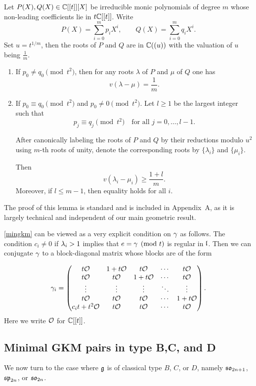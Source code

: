 \documentclass[11pt]{article}
\numberwithin{equation}{section}
\begin{document}
\begin{lem}\label{separate valuations}
Let $P(X),Q(X)\in \mathbb{C}[[t]][X]$ be irreducible monic polynomials of degree $m$
whose non-leading coefficients lie in $t\mathbb{C}[[t]]$. Write
\[
P(X)=\sum_{i=0}^{m} p_i X^i,
\qquad
Q(X)=\sum_{i=0}^{m} q_i X^i.
\]
Set $u=t^{1/m}$, then the roots of $P$ and $Q$ are in $\mathbb{C}((u))$ with the valuation of $u$ being $\frac{1}{m}$.
\begin{enumerate}
    \item If $p_0\neq q_0 \pmod{t^2}$, then for any roots $\lambda$ of $P$ and $\mu$ of $Q$ one has
\[
v(\lambda-\mu)=\frac{1}{m}.
\]
\item If $p_0\equiv q_0 \pmod{t^2}$ and $p_0\neq 0 \pmod{t^2}$. Let $l\ge 1$ be the largest integer such that
\[
p_j \equiv q_j \pmod{t^2}
\quad\text{for all } j=0,\dots,l-1.
\]

After canonically labeling the roots of $P$ and $Q$ by their reductions
modulo $u^2$ using $m$-th roots of unity, denote the corresponding roots by
$\{\lambda_i\}$ and $\{\mu_i\}$.

Then
\[
v(\lambda_i-\mu_i)\ge \frac{1+l}{m}.
\]
Moreover, if $l\leqslant m-1$, then equality holds for all $i$.
\end{enumerate}
\end{lem}
The proof of this lemma is standard and is included in Appendix~A, as it is largely
technical and independent of our main geometric result.
\begin{rem}
    \cref{mingkm} can be viewed as a very explicit condition on $\gamma$ as follows. The condition $c_i\neq 0$ if $\lambda_i>1$ implies that $e=\gamma\pmod{t}$ is regular in $\mathfrak{l}$. Then we can conjugate $\gamma$ to a block-diagonal matrix whose blocks are of the form

    \[ \gamma_i=
\begin{pmatrix}
t\mathcal{O} & 1+t\mathcal{O} & t\mathcal{O} & \cdots & t\mathcal{O} \\
t\mathcal{O} & t\mathcal{O} & 1+t\mathcal{O} & \cdots & t\mathcal{O} \\
\vdots & \vdots & \vdots & \ddots & \vdots \\
t\mathcal{O} & t\mathcal{O} & t\mathcal{O} & \cdots & 1+t\mathcal{O} \\
c_it+t^2\mathcal{O} & t\mathcal{O} & t\mathcal{O} & \cdots & t\mathcal{O}
\end{pmatrix}.
\]
Here we write $\mathcal{O}$ for $\mathbb{C}[[t]]$.
\end{rem}





\subsection{Minimal GKM pairs in type B,C, and D}
We now turn to the case where $\mathfrak{g}$ is of classical type $B$, $C$, or $D$,
namely $\mathfrak{so}_{2n+1}$, $\mathfrak{sp}_{2n}$,  or $\mathfrak{so}_{2n}$.
\end{document}
